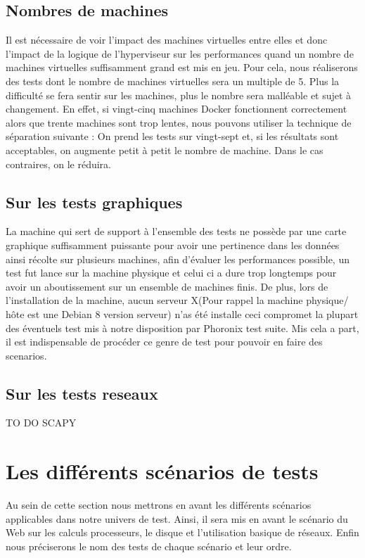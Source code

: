 \subsection{Nombres de machines}
Il est nécessaire de voir l'impact des machines virtuelles entre elles et donc l'impact de la logique de l'hyperviseur sur les performances quand un nombre de machines virtuelles suffisamment grand est mis en jeu. Pour cela, nous réaliserons des tests dont le nombre de machines virtuelles sera un multiple de 5. Plus la difficulté se fera sentir sur les machines, plus le nombre sera malléable et sujet à changement. En effet, si vingt-cinq machines Docker fonctionnent correctement alors que trente machines sont trop lentes, nous pouvons utiliser la technique de séparation suivante : On prend les tests sur vingt-sept et, si les résultats sont acceptables, on augmente petit à petit le nombre de machine. Dans le cas contraires, on le réduira.  

\subsection{Sur les tests graphiques}
La machine qui sert de support à l'ensemble des tests ne possède par une carte graphique suffisamment puissante pour avoir une pertinence dans les données ainsi récolte sur plusieurs machines, afin d’évaluer les performances possible, un test fut lance sur la machine physique et celui ci a dure trop longtemps pour avoir un aboutissement sur un ensemble de machines finis. De plus, lors de l'installation de la machine, aucun serveur X(Pour rappel la machine physique/ hôte est une Debian 8 version serveur) n'as été installe ceci compromet la plupart des éventuels test mis à notre disposition par Phoronix test suite. Mis cela a part, il est indispensable de procéder ce genre de test pour pouvoir en faire des scenarios.


\subsection{Sur les tests reseaux}
TO DO SCAPY


\section{Les différents scénarios de tests}
Au sein de cette section nous mettrons en avant les différents scénarios applicables dans notre univers de test. Ainsi, il sera mis en avant le scénario du Web sur les calculs processeurs, le disque et l'utilisation basique de réseaux. Enfin nous préciserons le nom des tests de chaque scénario et leur ordre. 

